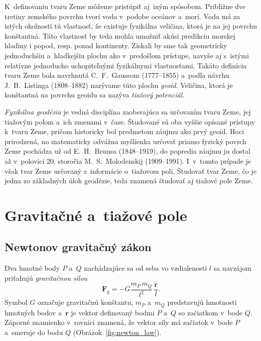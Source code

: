 \documentclass[a4paper, 12pt]{book}
\newcommand{\gidx}{\mathrm g}
\let\vec\mathbf
\begin{document}
K~definovaniu tvaru Zeme môžeme pristúpiť aj~iným spôsobom.  Približne dve
tretiny zemského povrchu tvorí voda v~podobe oceánov a~morí.  Voda má za istých
okolností tú vlastnosť, že existuje fyzikálna veličina, ktorá je na jej povrchu
konštantná.  Táto vlastnosť by teda mohla umožniť akúsi predikciu morskej
hladiny i popod, resp. ponad kontinenty.  Získali by sme tak geometricky
jednoduchšiu a~hladkejšiu plochu ako v~predošlom prístupe, navyše aj
s~istými relatívne jednoducho uchopiteľnými fyzikálnymi vlastnosťami.  Takáto
definícia tvaru Zeme bola navrhnutá C.~F.~Gaussom (1777--1855) a~podľa návrhu
J.~B.~Listinga (1808--1882) nazývame túto plochu \emph{geoid}.  Veličina, ktorá
je konštantná na povrchu geoidu sa nazýva \emph{tiažový potenciál}.

\emph{Fyzikálna geodézia} je vedná disciplína zaoberajúca sa určovaním tvaru
Zeme, jej tiažovým poľom a~ich zmenami v~čase.  Študované sú oba vyššie opísané
prístupy k~tvaru Zeme, pričom historicky bol predmetom záujmu ako prvý geoid.
Hoci prirodzená, no matematicky odvážna myšlienka určovať priamo fyzický povrch
Zeme pochádza už od E.~H.~Brunsa (1848--1919), do popredia záujmu ju dostal až
v~polovici 20. storočia M.~S.~Molodenskij (1909--1991).  I~v~tomto prípade je
však tvar Zeme určovaný z~informácie o~tiažovom poli.  Študovať tvar Zeme, čo 
je jedna zo základných úloh geodézie, teda znamená študovať aj tiažové
pole Zeme.







\chapter{Gravitačné a~tiažové pole}
\label{sec:gravitational_and_gravity_field}






\section{Newtonov gravitačný zákon}
\label{sec:newton_law}

Dva hmotné body $P$ a~$Q$ nachádzajúce sa od seba vo vzdialenosti $l$ sa
navzájom priťahujú \emph{gravitačnou silou}
%
\begin{equation}
\label{eq:newton_law}
\vec F_\gidx = -G \frac{m_P \, m_Q}{l^2} \, \frac{\vec r}{l}{.}
\end{equation}
%
Symbol $G$ označuje gravitačnú konštantu, $m_P$ a~$m_Q$ predstavujú hmotnosti
hmotných bodov a~$\vec r$ je vektor definovaný bodmi $P$ a~$Q$ so začiatkom
v~bode $Q$.  Záporné znamienko v~rovnici znamená, že vektor sily má začiatok
v~bode $P$ a~smeruje do bodu $Q$ (Obrázok~\ref{fig:newton_law}).
\end{document}
